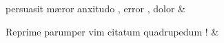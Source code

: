 \documentclass[12pt,onecolumn,twoside,a4paper]{memoir}
\begin{document}
\begin{pairs}
\begin{Leftside}
                              persuasit
                              mæror
                              anxitudo
                              ,
                              error
                              ,
                              dolor \&
                         \stanza {}
                     
                              Reprime
                              parumper
                              vim
                              citatum
                              quadrupedum
                              ! \&
                     
                  \endnumbering
		\end{Leftside}
                  \begin{Rightside}
			\beginnumbering
			\numberstanzafalse
                     

\end{Rightside}
\end{pairs}
\end{document}
